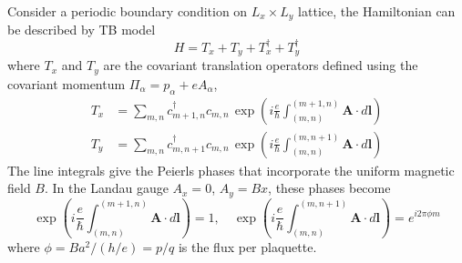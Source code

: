 \documentclass[12pt,a4paper]{article}
\begin{document}
    Consider a periodic boundary condition on $L_x \times L_y$ lattice, the Hamiltonian can be described by TB model
    \begin{equation}
        H = T_x + T_y + T_x^{\dagger} + T_y^{\dagger}
    \end{equation}
    where $T_x$ and $T_y$ are the covariant translation operators defined using the covariant momentum $\Pi_\alpha = p_\alpha + eA_\alpha$,
    \begin{equation}
    \begin{aligned}
        T_x &= \sum_{m,n} c_{m+1,n}^\dagger c_{m,n} \, \exp\left(i\frac{e}{\hbar}\int_{(m,n)}^{(m+1,n)} \mathbf{A}\cdot d\mathbf{l}\right) \\
        T_y &= \sum_{m,n} c_{m,n+1}^\dagger c_{m,n} \, \exp\left(i\frac{e}{\hbar}\int_{(m,n)}^{(m,n+1)} \mathbf{A}\cdot d\mathbf{l}\right)
    \end{aligned}
    \end{equation}
    The line integrals give the Peierls phases that incorporate the uniform magnetic field $B$. In the Landau gauge $A_x = 0$, $A_y = Bx$, these phases become
    \[
        \exp\left(i\frac{e}{\hbar}\int_{(m,n)}^{(m+1,n)} \mathbf{A}\cdot d\mathbf{l}\right) = 1, \quad
        \exp\left(i\frac{e}{\hbar}\int_{(m,n)}^{(m,n+1)} \mathbf{A}\cdot d\mathbf{l}\right) = e^{i2\pi\phi m}
    \]
    where $\phi = Ba^2/(h/e) = p/q$ is the flux per plaquette.
\end{document}
